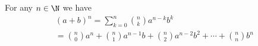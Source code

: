 

\setcounter{section}{3}
\setcounter{subsection}{4}
\setcounter{dfn}{6}

\begin{thm}
For any $n \in \N$ we have
\begin{multline*}
(a+b)^n = \sum_{k=0}^n \binom{n}{k} a^{n-k}b^k\\
= \binom{n}{0}a^n + \binom{n}{1}a^{n-1}b + \binom{n}{2}a^{n-2}b^2 + \cdots + \binom{n}{n}b^n
\end{multline*}
\end{thm}


